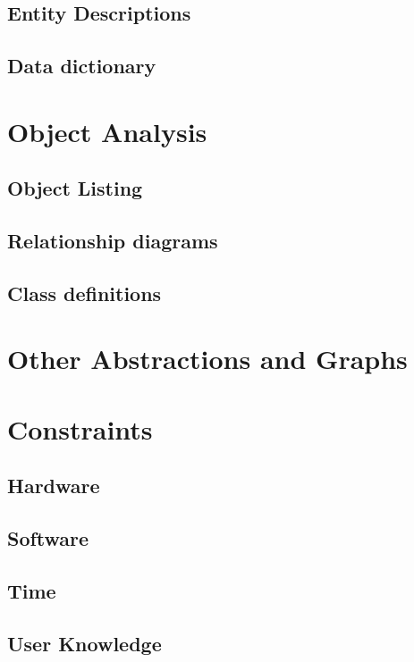 \subsection{Entity Descriptions}

\subsection{Data dictionary}

\section{Object Analysis}

\subsection{Object Listing}

\subsection{Relationship diagrams}

\subsection{Class definitions}

\section{Other Abstractions and Graphs}

\section{Constraints}

\subsection{Hardware}

\subsection{Software}

\subsection{Time}

\subsection{User Knowledge}

